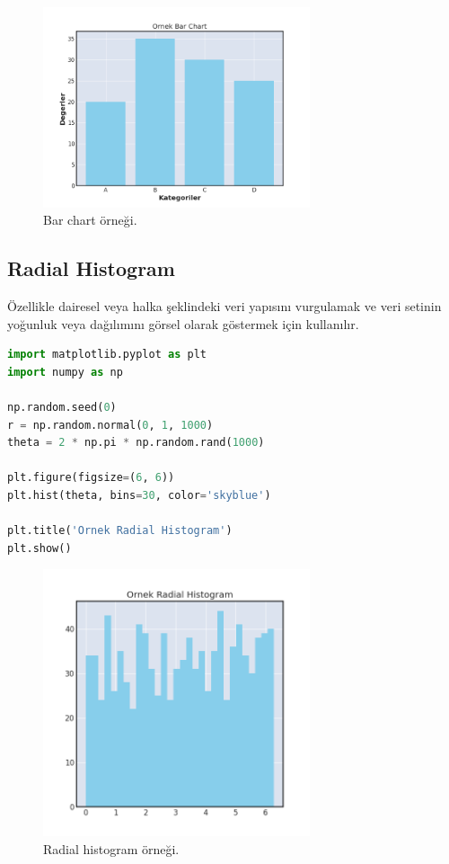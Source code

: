 \begin{figure}[h]
    \centering
    \includegraphics[width=0.7\textwidth]{images/bar_chart.png}
    \caption{Bar chart örneği.}
    \label{fig:enter-label}
\end{figure}

\newpage

\subsection{Radial Histogram}
Özellikle dairesel veya halka şeklindeki veri yapısını vurgulamak ve veri setinin yoğunluk veya dağılımını görsel olarak göstermek için kullanılır.

\begin{lstlisting}[language=Python]
import matplotlib.pyplot as plt
import numpy as np

np.random.seed(0)
r = np.random.normal(0, 1, 1000)
theta = 2 * np.pi * np.random.rand(1000)

plt.figure(figsize=(6, 6))
plt.hist(theta, bins=30, color='skyblue')

plt.title('Ornek Radial Histogram')
plt.show()
\end{lstlisting}

\begin{figure}[h]
    \centering
    \includegraphics[width=0.7\textwidth]{images/radial_histogram.png}
    \caption{Radial histogram örneği.}
    \label{fig:enter-label}
\end{figure}

